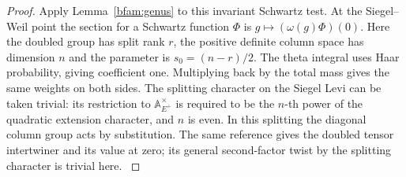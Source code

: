 \begin{proof}
Apply Lemma~\ref{bfam:genus} to this invariant Schwartz test.
At the Siegel--Weil point the section for a Schwartz function $\Phi$
is $g\mapsto(\omega(g)\Phi)(0)$. Here the doubled group has split
rank $r$, the positive definite column space has dimension $n$ and
the parameter is $s_0=(n-r)/2$. The theta integral uses Haar
probability, giving coefficient one. Multiplying back by the
total mass gives the same weights on both sides.
The splitting character on the Siegel Levi can be taken trivial:
its restriction to $\mathbb A_{E^+}^\times$ is required to be the
$n$-th power of the quadratic extension character, and $n$ is even.
In this splitting the diagonal column group acts by substitution.
The same reference gives the doubled tensor intertwiner and its
value at zero; its general second-factor twist by the splitting
character is trivial here.
\cite[\S\S2.8, 3.1, 11.3 and Theorem~7.1]{ganQiuTakeda}


\end{proof}
